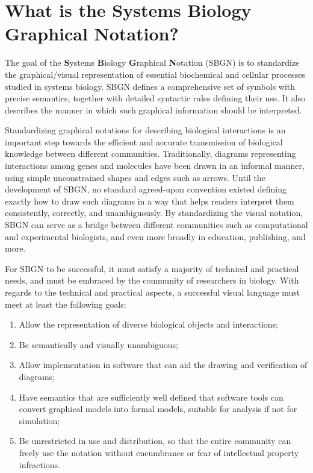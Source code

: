 
\chapter{What is the Systems Biology Graphical Notation?}

The goal of the \textbf{S}ystems \textbf{B}iology \textbf{G}raphical \textbf{N}otation (SBGN) is to standardize the graphical/visual representation of essential biochemical and cellular processes studied in systems biology.  SBGN defines a comprehensive set of symbols with precise semantics, together with detailed syntactic rules defining their use.  It also describes the manner in which such graphical information should be interpreted. 

Standardizing graphical notations for describing biological interactions is an important step towards the efficient and accurate transmission of biological knowledge between different communities.  Traditionally, diagrams representing interactions among genes and molecules have been drawn in an informal manner, using simple unconstrained shapes and edges such as arrows.  Until the development of SBGN, no standard agreed-upon convention existed defining exactly how to draw such diagrams in a way that helps readers interpret them consistently, correctly, and unambiguously.  By standardizing the visual notation, SBGN can serve as a bridge between different communities such as computational and experimental biologists, and even more broadly in education, publishing, and more.

For SBGN to be successful, it must satisfy a majority of technical and practical needs, and must be embraced by the community of researchers in biology.  With regards to the technical and practical aspects, a successful visual language must meet at least the following goals:

\begin{enumerate}

\item Allow the representation of diverse biological objects and interactions;

\item Be semantically and visually unambiguous;

\item Allow implementation in software that can aid the drawing and verification of diagrams;

\item Have semantics that are sufficiently well defined that software tools can convert graphical models into formal models, suitable for analysis if not for simulation;

\item Be unrestricted in use and distribution, so that the entire community can freely use the notation without encumbrance or fear of intellectual property infractions.

\end{enumerate}

